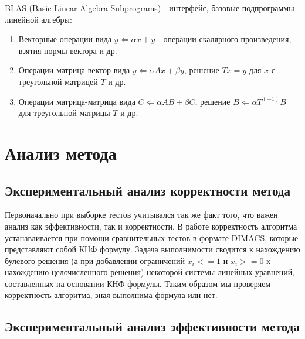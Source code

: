 \documentclass[a4paper,14pt,russian]{extreport}
\begin{document}
\par BLAS (Basic Linear Algebra Subprograms) - интерфейс, базовые подпрограммы линейной алгебры:
  \begin{enumerate}
  \item Векторные операции вида $y\Leftarrow\alpha x + y$ - операции скалярного произведения, взятия нормы вектора и др.
  \item Операции матрица-вектор вида $y\Leftarrow\alpha Ax + \beta y$, решение $Tx = y$ для $x$ с треугольной матрицей $T$ и др.
  \item Операции матрица-матрица вида $C\Leftarrow \alpha AB + \beta C$, решение $B\Leftarrow \alpha T^(-1)B$ для треугольной матрицы $T$ и др.
  \end{enumerate}
 

\chapter{Анализ метода}

\section{Экспериментальный анализ корректности метода}

Первоначально при выборке тестов учитывался так же факт того, что важен анализ как эффективности, так и корректности. В работе корректность алгоритма устанавливается при помощи сравнительных тестов в формате DIMACS, которые представляют собой КНФ формулу. Задача выполнимости сводится к нахождению булевого решения (а при добавлении ограничений $x_i <= 1$ и $x_i >= 0$ к нахождению целочисленного решения) некоторой системы линейных уравнений, составленных на основании КНФ формулы. Таким образом мы проверяем корректность алгоритма, зная выполнима формула или нет.


\section{Экспериментальный анализ эффективности метода}
\end{document}
